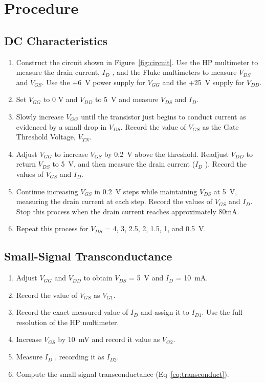 \section{Procedure}
\label{sec:procedure}

\subsection{DC Characteristics}
\label{sec:inverter}

\begin{enumerate}
\item Construct the circuit shown in Figure~\ref{fig:circuit}. Use the HP multimeter to measure the drain current, $I_D$ , and the Fluke multimeters to measure $V_{DS}$ and $V_{GS}$. Use the +\SI{6}{V} power supply for $V_{GG}$ and the +\SI{25}{V} supply for $V_{DD}$.
\item Set $V_{GG}$ to 0 V and $V_{DD}$ to \SI{5}{V} and measure $V_{DS}$ and $I_D$.
\item Slowly increase $V_{GG}$ until the transistor just begins to conduct current as evidenced by a small drop in $V_{DS}$. Record the value of $V_{GS}$ as the Gate Threshold Voltage, $V_{TN}$.
\item Adjust $V_{GG}$ to increase $V_{GS}$ by \SI{0.2}{V} above the threshold. Readjust $V_{DD}$ to return $V_{DS}$ to \SI{5}{V}, and then measure the drain current ($I_D$ ). Record the values of $V_{GS}$  and  $I_D$.
\item Continue increasing $V_{GS}$ in \SI{0.2}{V} steps while maintaining $V_{DS}$ at \SI{5}{V}, measuring the drain current at each step. Record the values of $V_{GS}$ and $I_D$. Stop this process when the drain current reaches approximately 80mA.
\item Repeat this process for $V_{DS}$ = 4, 3, 2.5, 2, 1.5, 1, and \SI{0.5}{V}.
\end{enumerate}

\subsection{Small-Signal Transconductance}
\label{sec:smallsig}

\begin{enumerate}
\item Adjust $V_{GG}$ and $V_{DD}$ to obtain $V_{DS}$ = \SI{5}{V} and $I_D$ = \SI{10}{mA}.
\item Record the value of $V_{GS}$ as $V_{G1}$.
\item Record the exact measured value of $I_D$ and assign it to $I_{D1}$. Use the full resolution of the HP multimeter.
\item Increase $V_{GS}$ by \SI{10}{mV} and record it value as $V_{G2}$.
\item Measure $I_D$ , recording it as $I_{D2}$.
\item Compute the small signal transconductance (Eq~\ref{eq:transconduct}).
\end{enumerate}

